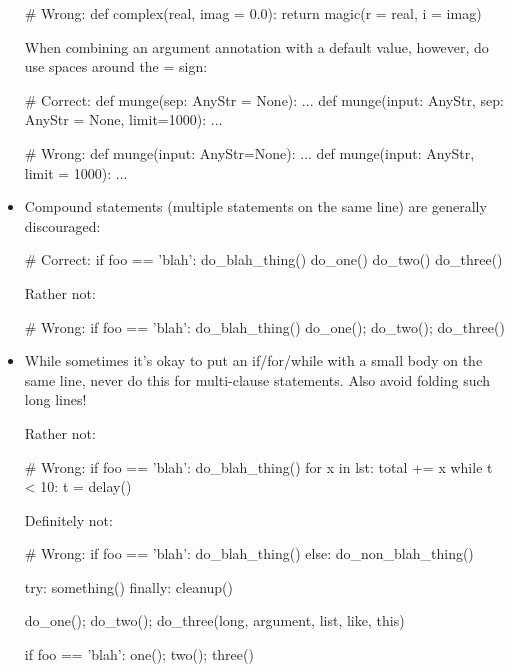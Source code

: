 \documentclass[a4paper,11pt]{article}
\begin{document}
\begin{itemize}
\begin{python}
# Wrong:
def complex(real, imag = 0.0):
    return magic(r = real, i = imag)
\end{python}
When combining an argument annotation with a default value, however, do use
spaces around the = sign:
\begin{python}
# Correct:
def munge(sep: AnyStr = None): ...
def munge(input: AnyStr, sep: AnyStr = None, limit=1000): ...
\end{python}
\begin{python}
# Wrong:
def munge(input: AnyStr=None): ...
def munge(input: AnyStr, limit = 1000): ...
\end{python}
\item Compound statements (multiple statements on the same line) are generally
discouraged:
\begin{python}
# Correct:
if foo == 'blah':
    do_blah_thing()
do_one()
do_two()
do_three()
\end{python}
Rather not:
\begin{python}
# Wrong:
if foo == 'blah': do_blah_thing()
do_one(); do_two(); do_three()
\end{python}
\item While sometimes it’s okay to put an if/for/while with a small body on the
same line, never do this for multi-clause statements. Also avoid folding such
long lines!
\par
Rather not:
\begin{python}
# Wrong:
if foo == 'blah': do_blah_thing()
for x in lst: total += x
while t < 10: t = delay()
\end{python}
Definitely not:
\begin{python}
# Wrong:
if foo == 'blah': do_blah_thing()
else: do_non_blah_thing()

try: something()
finally: cleanup()

do_one(); do_two(); do_three(long, argument,
                             list, like, this)

if foo == 'blah': one(); two(); three()
\end{python}
\end{itemize}
\end{document}
